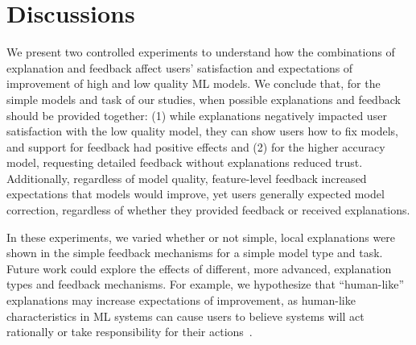 \section{Discussions}
We present two controlled experiments to understand how the combinations of explanation and feedback affect users' satisfaction and expectations of improvement of high and low quality ML models. We conclude that, for the simple models and task of our studies, when possible explanations and feedback should be provided together: (1) while explanations negatively impacted user satisfaction with the low quality model, they can show users how to fix models, and support for feedback had positive effects and (2) for the higher accuracy model, requesting detailed feedback without explanations reduced trust.
Additionally, regardless of model quality, feature-level feedback increased expectations that models would improve, yet users generally expected model correction, regardless of whether they provided feedback or received explanations.  

In these experiments, we varied whether or not simple, local explanations were shown in the simple feedback mechanisms for a simple model type and task. 
Future work could explore the effects of different, more advanced, explanation types and feedback mechanisms. 
For example, we hypothesize that ``human-like'' explanations may increase expectations of improvement, as human-like characteristics in ML systems can cause users to believe systems will act rationally or take responsibility for their actions~\cite{Hook2000StepsReal}. 

